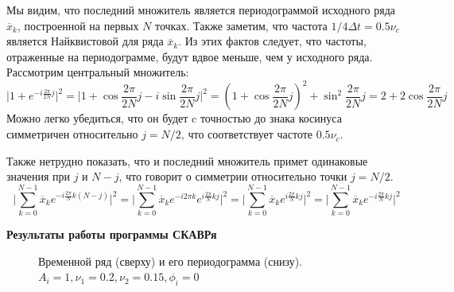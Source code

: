 \documentclass[a4paper,12pt]{report}
\begin{document}
Мы видим, что последний множитель является периодограммой исходного ряда $\overline{x}_k$, построенной на первых $N$ точках. Также заметим, что частота $1/4{\Delta}t = 0.5\nu_c$
является Найквистовой для ряда $\overline{x}_k$. Из этих фактов следует, что частоты, отраженные на периодограмме, будут вдвое меньше, чем у исходного ряда.
Рассмотрим центральный множитель:
\begin{equation}
\big\vert 1 + e^{-i\frac{2\pi}{2N}j} \big\vert^2 = \big\vert 1 + \cos{\frac{2\pi}{2N}j} - i\sin{\frac{2\pi}{2N}j} \big\vert^2 = (1 + \cos{\frac{2\pi}{2N}j})^2 + \sin^2{\frac{2\pi}{2N}j} = 
2 + 2\cos{\frac{2\pi}{2N}j}
\end{equation}
Можно легко убедиться, что он будет c точностью до знака косинуса симметричен относительно $j = N/2$, что соответствует частоте $0.5\nu_c$. 

Также нетрудно показать, что и последний множитель примет одинаковые значения при $j$ и $N-j$, что говорит о симметрии относительно точки $j = N/2$.
\begin{equation}
\Big\vert \sum\limits_{k=0}^{N-1} \overline{x}_{k}e^{-i\frac{2\pi}{N}k(N-j)} \Big\vert^2 = \Big\vert \sum\limits_{k=0}^{N-1} \overline{x}_{k}e^{-i2\pi{k}}e^{i\frac{2\pi}{N}kj} \Big\vert^2 = 
\Big\vert \sum\limits_{k=0}^{N-1} \overline{x}_{k}e^{i\frac{2\pi}{N}kj} \Big\vert^2 = \Big\vert \sum\limits_{k=0}^{N-1} \overline{x}_{k}e^{-i\frac{2\pi}{N}kj} \Big\vert^2
\end{equation}

\newpage

\begin{center}
{\bf Результаты работы программы СКАВРя}
\end{center}
\begin{figure}[h]
\caption{Временной ряд (сверху) и его периодограмма (снизу). $A_i = 1, \nu_1 = 0.2, \nu_2 = 0.15, \phi_i = 0$ }
\end{figure}
\end{document}
